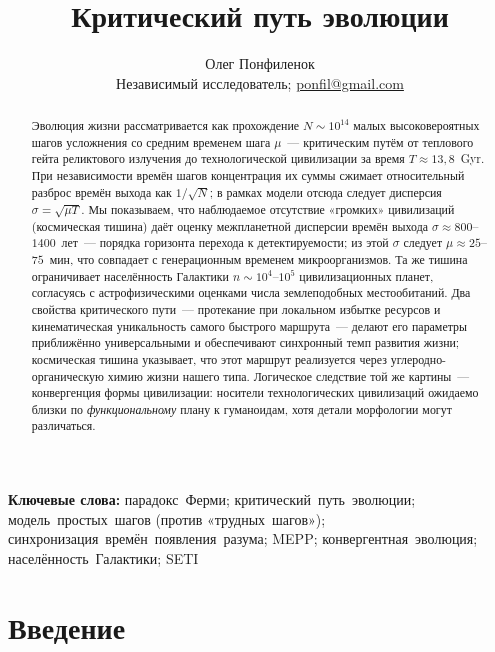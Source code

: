 \documentclass[12pt,a4paper]{article}
\title{\textbf{Критический путь эволюции}}
\author{%
  Олег Понфиленок\\[0.35em]%
  {\normalsize Независимый исследователь; \href{mailto:ponfil@gmail.com}{ponfil@gmail.com}}%
}
\date{}
\begin{document}
\pagecolor{black}
\color{white}

\maketitle

\begin{abstract}
Эволюция жизни рассматривается как прохождение $N \sim 10^{14}$ малых высоковероятных шагов усложнения со средним временем шага $\mu$~--- критическим путём от теплового гейта реликтового излучения до технологической цивилизации за время $T \approx 13{,}8$~Gyr. При независимости времён шагов концентрация их суммы сжимает относительный разброс времён выхода как $1/\sqrt{N}$; в рамках модели отсюда следует дисперсия $\sigma = \sqrt{\mu T}$. Мы показываем, что наблюдаемое отсутствие «громких» цивилизаций (космическая тишина) даёт оценку межпланетной дисперсии времён выхода $\sigma \approx 800$--$1400$~лет~--- порядка горизонта перехода к детектируемости; из этой $\sigma$ следует $\mu \approx 25$--$75$~мин, что совпадает с генерационным временем микроорганизмов. Та же тишина ограничивает населённость Галактики $n \sim 10^4$--$10^5$ цивилизационных планет, согласуясь с астрофизическими оценками числа землеподобных местообитаний. Два свойства критического пути~--- протекание при локальном избытке ресурсов и кинематическая уникальность самого быстрого маршрута~--- делают его параметры приближённо универсальными и обеспечивают синхронный темп развития жизни; космическая тишина указывает, что этот маршрут реализуется через углеродно-органическую химию жизни нашего типа. Логическое следствие той же картины~--- конвергенция формы цивилизации: носители технологических цивилизаций ожидаемо близки по \emph{функциональному} плану к гуманоидам, хотя детали морфологии могут различаться.
\end{abstract}

\noindent\textbf{Ключевые слова:} парадокс~Ферми; критический~путь~эволюции; модель~простых~шагов (против «трудных~шагов»); синхронизация~времён~появления~разума; MEPP; конвергентная~эволюция; населённость~Галактики; SETI

\section{Введение}
\end{document}
